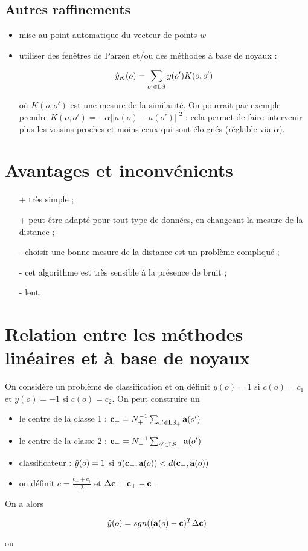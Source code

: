 		
		\subsection{Autres raffinements}
		
		\begin{itemize}
			\item mise au point automatique du vecteur de points $w$
			\item utiliser des fenêtres de Parzen et/ou des méthodes à base de noyaux :
			
			$$\hat{y}_K(o) = \sum_{o' \in \text{LS}} y(o') K(o, o')$$
			
			où $K(o, o')$ est une mesure de la similarité. On pourrait par exemple prendre $K(o, o') = -\alpha \vert \vert a(o) - a(o') \vert \vert^2$ : cela permet de faire intervenir plus les voisins proches et moins ceux qui sont éloignés (réglable via $\alpha$).
		\end{itemize}

	\section{Avantages et inconvénients}
		
	\begin{itemize}
		\item[+] très simple ;
		\item[+] peut être adapté pour tout type de données, en changeant la mesure de la distance ;
		\item[-] choisir une bonne mesure de la distance est un problème compliqué ;
		\item[-] cet algorithme est très sensible à la présence de bruit ;
		\item[-] lent.
	\end{itemize}
	
	
	
	
	\section{Relation entre les méthodes linéaires et à base de noyaux}
	
	On considère un problème de classification et on définit $y(o) = 1$ si $c(o) = c_1$ et $y(o) = -1$ si $c(o) = c_2$. On peut construire un
	
	\begin{itemize}
		\item le centre de la classe 1 : $\textbf{c}_+ = N_+^{-1} \sum_{o' \in \text{LS}_+} \textbf{a}(o')$
		\item le centre de la classe 2 : $\textbf{c}_- = N_-^{-1} \sum_{o' \in \text{LS}_-} \textbf{a}(o')$
		\item classificateur : $\hat{y}(o) = 1$ si $d(\textbf{c}_+, \textbf{a}(o)) < d(\textbf{c}_-, \textbf{a}(o))$
		\item on définit $c = \frac{c_+ + c_)}{2}$ et $\Delta \textbf{c} = \textbf{c}_+ - \textbf{c}_-$
	\end{itemize}
	
	On a alors
	
	$$\hat{y}(o) = sgn((\textbf{a}(o) - \textbf{c})^T \Delta \textbf{c})$$
	
	ou
	
	
